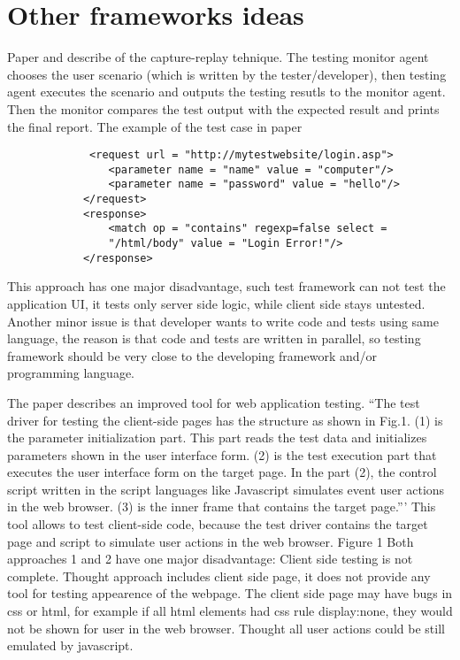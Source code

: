    \section {Other frameworks ideas}
   		Paper \cite{Xu1} and \cite{Zhongen2} describe of the capture-replay
   		tehnique.
   		The testing monitor agent chooses the user scenario (which is written by the tester/developer),
   		 then testing agent executes the scenario and outputs the testing
   		 resutls to the monitor agent. Then the monitor compares the test output
   		 with the expected result and prints the final report. The example of the
   		 test case in paper \cite{Zhongen2}
   		 \lstset{language=XML}
   		 \begin{lstlisting}
			 <request url = "http://mytestwebsite/login.asp"> 
			 	<parameter name = "name" value = "computer"/> 
			 	<parameter name = "password" value = "hello"/> 
			</request> 
			<response> 
			 	<match op = "contains" regexp=false select = 
			 	"/html/body" value = "Login Error!"/> 
			</response> 
   		\end{lstlisting}	
		This approach has one major disadvantage, such test framework can not test
		the application UI, it tests only server side logic, while client
		side stays untested. Another minor issue is that developer wants to write
		code and tests using same language, the reason is that code and tests are
		written in parallel, so testing framework should be very close to the
		developing framework and/or programming language.
		
		The paper \cite{testGen3} describes an improved tool for web application testing. 
			``The test driver for testing the client-side pages has the structure as
			shown in Fig.1. (1)  is the parameter initialization part. This part reads the test data and 
		 initializes parameters shown in the  user interface form. (2) is the test 
		 execution part that executes the  user interface form on the target 
		 page. In the part (2), the control  script written in the script 
		 languages like Javascript simulates event user actions in the web browser. (3) is the inner frame 
		 that contains the target page.'''
		  This tool allows to test client-side code, because the test driver
		  contains the target page and script to simulate user actions in the
		  web browser. 
		  				Figure 1
		Both approaches 1 and 2 have one major disadvantage:
			Client side testing is not complete. Thought approach includes client side
			page, it does not provide any tool for testing appearence of the webpage. The
			client side page may have bugs in css or html, for example if all html
			elements had css rule display:none, they would not be shown for user in the
			web browser. Thought all user actions could be still emulated by javascript.
